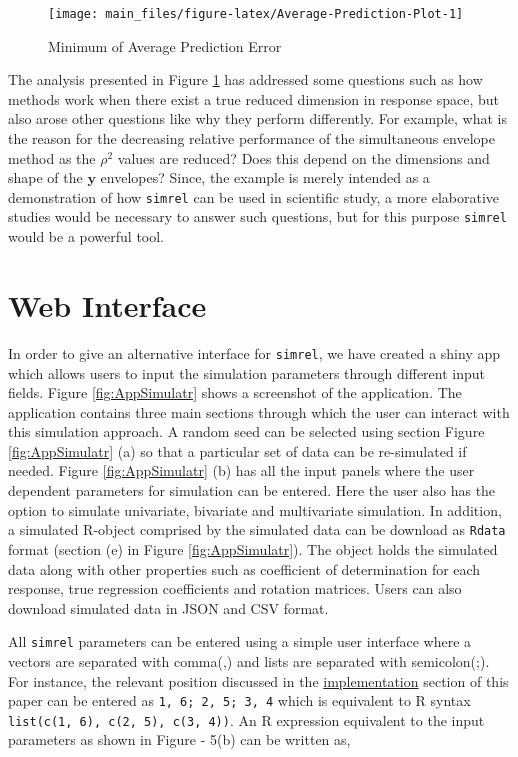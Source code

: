 \documentclass[review]{elsarticle}
\theoremstyle{definition}
\theoremstyle{definition}
\theoremstyle{definition}
\theoremstyle{remark}
\begin{document}
\begin{figure}[!htb]
\texttt{[image: main\_files/figure-latex/Average-Prediction-Plot-1]} \caption{Minimum of Average Prediction Error}\label{fig:Average-Prediction-Plot}
\end{figure}

The analysis presented in Figure \ref{fig:Average-Prediction-Plot} has
addressed some questions such as how methods work when there exist a
true reduced dimension in response space, but also arose other questions
like why they perform differently. For example, what is the reason for
the decreasing relative performance of the simultaneous envelope method
as the \(\rho^2\) values are reduced? Does this depend on the dimensions
and shape of the \(\mathbf{y}\) envelopes? Since, the example is merely
intended as a demonstration of how \texttt{simrel} can be used in
scientific study, a more elaborative studies would be necessary to
answer such questions, but for this purpose \texttt{simrel} would be a
powerful tool.

\hypertarget{web-interface}{\section{Web
Interface}\label{web-interface}}

In order to give an alternative interface for \texttt{simrel}, we have
created a shiny app which allows users to input the simulation
parameters through different input fields. Figure \ref{fig:AppSimulatr}
shows a screenshot of the application. The application contains three
main sections through which the user can interact with this simulation
approach. A random seed can be selected using section Figure
\ref{fig:AppSimulatr} (a) so that a particular set of data can be
re-simulated if needed. Figure \ref{fig:AppSimulatr} (b) has all the
input panels where the user dependent parameters for simulation can be
entered. Here the user also has the option to simulate univariate,
bivariate and multivariate simulation. In addition, a simulated R-object
comprised by the simulated data can be download as \texttt{Rdata} format
(section (e) in Figure \ref{fig:AppSimulatr}). The object holds the
simulated data along with other properties such as coefficient of
determination for each response, true regression coefficients and
rotation matrices. Users can also download simulated data in JSON and
CSV format.

All \texttt{simrel} parameters can be entered using a simple user
interface where a vectors are separated with comma(,) and lists are
separated with semicolon(;). For instance, the relevant position
discussed in the \protect\hyperlink{implementation}{implementation}
section of this paper can be entered as \texttt{1,\ 6;\ 2,\ 5;\ 3,\ 4}
which is equivalent to R syntax
\texttt{list(c(1,\ 6),\ c(2,\ 5),\ c(3,\ 4))}. An R expression
equivalent to the input parameters as shown in Figure - 5(b) can be
written as,
\end{document}
